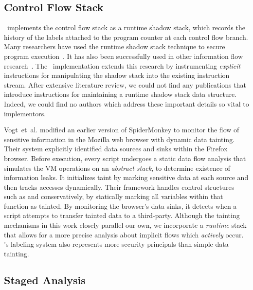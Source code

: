 \subsection{Control Flow Stack}

\JitFlow\ implements the control flow stack as a runtime shadow stack, which records the history of the labels attached to the program counter at each control flow branch.
Many researchers have used the runtime shadow stack technique to secure program execution~\cite{abadi2009control, frantzen2001stackghost, prasad2003binary}.
It has also been successfully used in other information flow research~\cite{lam2006general}.
The \JitFlow\ implementation extends this research by instrumenting \emph{explicit} instructions for manipulating the shadow stack into the existing instruction stream.
After extensive literature review, we could not find any publications that introduce instructions for maintaining a runtime shadow stack data structure.
Indeed, we could find no authors which address these important details so vital to implementors.

Vogt~et~al.\cite{vogt.etal+07} modified an earlier version of SpiderMonkey to monitor the flow of sensitive information in the Mozilla web browser with dynamic data tainting.
Their system explicitly identified data sources and sinks within the Firefox browser.
Before execution, every script undergoes a static data flow analysis that simulates the VM operations on an \emph{abstract stack}, to determine existence of information leaks.
It initializes taint by marking sensitive data at each source and then tracks accesses dynamically.
Their framework handles control structures such as  and  conservatively, by statically marking all variables within that function as tainted.
By monitoring the browser's data sinks, it detects when a script attempts to transfer tainted data to a third-party.
Although the tainting mechanisms in this work closely parallel our own, we incorporate a \emph{runtime} stack that allows for a more precise analysis about implicit flows which \emph{actively} occur.
\JitFlow's labeling system also represents more security principals than simple data tainting.

\subsection{Staged Analysis}

